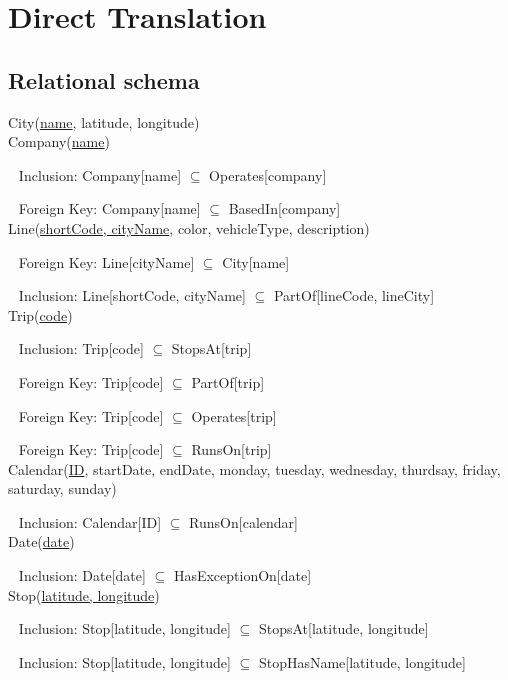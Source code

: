 \section{Direct Translation}

\subsection{Relational schema}

	City(\uline{name}, latitude, longitude) \\
	
	
	Company(\uline{name})
	
	$ \ \ $ Inclusion: Company[name] $\subseteq$ Operates[company]
	
	$ \ \ $ Foreign Key: Company[name] $\subseteq$ BasedIn[company] \\
	
	
	Line(\uline{shortCode, cityName}, color, vehicleType, description)
	
	$ \ \ $ Foreign Key: Line[cityName] $\subseteq$ City[name]
	
	$ \ \ $ Inclusion: Line[shortCode, cityName] $\subseteq$ PartOf[lineCode, lineCity] \\

	
	Trip(\uline{code})
	
	$ \ \ $ Inclusion: Trip[code] $\subseteq$ StopsAt[trip]
	
	$ \ \ $ Foreign Key: Trip[code] $\subseteq$ PartOf[trip]
	
	$ \ \ $ Foreign Key: Trip[code] $\subseteq$ Operates[trip]
	
	$ \ \ $ Foreign Key: Trip[code] $\subseteq$ RunsOn[trip] \\
	
	
	Calendar(\uline{ID}, startDate, endDate, {\small monday, tuesday, wednesday, thurdsay, friday, saturday, sunday) }
	
	$ \ \ $ Inclusion: Calendar[ID] $\subseteq$ RunsOn[calendar] \\
	
	
	Date(\uline{date})
	
	$ \ \ $ Inclusion: Date[date] $\subseteq$ HasExceptionOn[date] \\
	
	
	Stop(\uline{latitude, longitude})
	
	$ \ \ $ Inclusion: Stop[latitude, longitude] $\subseteq$ StopsAt[latitude, longitude] 
	
	$ \ \ $ Inclusion: Stop[latitude, longitude] $\subseteq$ StopHasName[latitude, longitude] 
	

